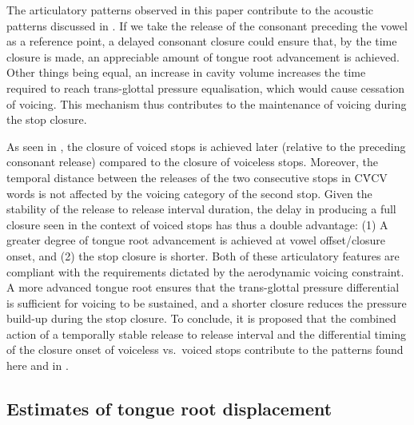 \documentclass[12pt,]{article}
\begin{document}
The articulatory patterns observed in this paper contribute to the
acoustic patterns discussed in \citet{coretta2018j}. If we take the
release of the consonant preceding the vowel as a reference point, a
delayed consonant closure could ensure that, by the time closure is
made, an appreciable amount of tongue root advancement is achieved.
Other things being equal, an increase in cavity volume increases the
time required to reach trans-glottal pressure equalisation, which would
cause cessation of voicing. This mechanism thus contributes to the
maintenance of voicing during the stop closure.

As seen in \citet{coretta2018j}, the closure of voiced stops is achieved
later (relative to the preceding consonant release) compared to the
closure of voiceless stops. Moreover, the temporal distance between the
releases of the two consecutive stops in CV́CV words is not affected by
the voicing category of the second stop. Given the stability of the
release to release interval duration, the delay in producing a full
closure seen in the context of voiced stops has thus a double advantage:
(1) A greater degree of tongue root advancement is achieved at vowel
offset/closure onset, and (2) the stop closure is shorter. Both of these
articulatory features are compliant with the requirements dictated by
the aerodynamic voicing constraint. A more advanced tongue root ensures
that the trans-glottal pressure differential is sufficient for voicing
to be sustained, and a shorter closure reduces the pressure build-up
during the stop closure. To conclude, it is proposed that the combined
action of a temporally stable release to release interval and the
differential timing of the closure onset of voiceless vs.~voiced stops
contribute to the patterns found here and in \citet{coretta2018j}.

\hypertarget{estimates-of-tongue-root-displacement}{%
\subsection{Estimates of tongue root
displacement}\label{estimates-of-tongue-root-displacement}}
\end{document}
